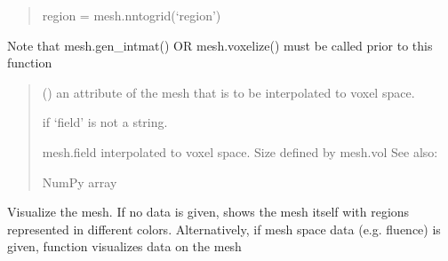 \documentclass[letterpaper,10pt,english]{sphinxmanual}
\begin{document}
\begin{fulllineitems}
\begin{fulllineitems}
\begin{quote}
\sphinxAtStartPar
region = mesh.nntogrid(‘region’)
\end{quote}

\sphinxAtStartPar
Note that mesh.gen\_intmat() OR mesh.voxelize() must be called prior to this function
\begin{quote}\begin{description}
\sphinxAtStartPar
{} () \textendash{} an attribute of the mesh that is to be interpolated to voxel space.

\sphinxAtStartPar
{} \textendash{} if ‘field’ is not a string.

\sphinxAtStartPar
{} \textendash{} mesh.field interpolated to voxel space. Size defined by mesh.vol
See also: {\hyperref[\detokenize{_autosummary/nirfasterff.utils.nntogrid:nirfasterff.utils.nntogrid}]{}}

\sphinxAtStartPar
NumPy array

\end{description}\end{quote}

\end{fulllineitems}


\begin{fulllineitems}
\label{\detokenize{_autosummary/nirfasterff.base.fluor_mesh.fluormesh:nirfasterff.base.fluor_mesh.fluormesh.plot}}
\pysigstartsignatures
\pysiglinewithargsret
{}
{\sphinxparamcomma {}\sphinxparamcomma {}\sphinxparamcomma {}\sphinxparamcomma {}}
{}
\pysigstopsignatures
\sphinxAtStartPar
Visualize the mesh. If no data is given, shows the mesh itself with regions represented in different colors.
Alternatively, if mesh space data (e.g. fluence) is given, function visualizes data on the mesh


\end{fulllineitems}
\end{fulllineitems}
\end{document}

